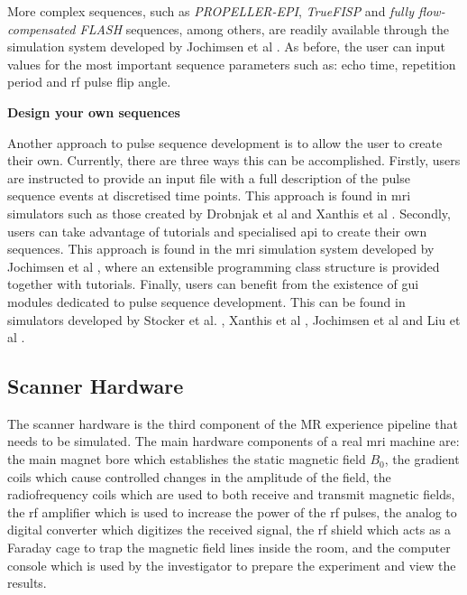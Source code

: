 \hfill

More complex sequences, such as \textit{PROPELLER-EPI}, \textit{TrueFISP} and \textit{fully flow-compensated FLASH} sequences, among others, are readily available through the simulation system developed by Jochimsen et al \cite{Jochimsen2004}.
As before, the user can input values for the most important sequence parameters such as: echo time, repetition period and \ac{rf} pulse flip angle.


\hfill

\large \textbf{Design your own sequences} \normalsize

Another approach to pulse sequence development is to allow the user to create their own.
Currently, there are three ways this can be accomplished.
Firstly, users are instructed to provide an input file with a full description of the pulse sequence events at discretised time points.
This approach is found in \ac{mri} simulators such as those created by Drobnjak et al \cite{Drobnjak2006} and Xanthis et al \cite{Xanthis2014}.
Secondly, users can take advantage of tutorials and specialised \ac{api} to create their own sequences.
This approach is found in the \ac{mri} simulation system developed by Jochimsen et al \cite{Jochimsen2004}, where an extensible programming class structure is provided together with tutorials.
Finally, users can benefit from the existence of \ac{gui} modules dedicated to pulse sequence development.
This can be found in simulators developed by Stocker et al. \cite{Stocker2010}, Xanthis et al \cite{Xanthis2014}, Jochimsen et al \cite{Jochimsen2004} and Liu et al \cite{Liu2013}.

\hfill

\subsection{Scanner Hardware}

The scanner hardware is the third component of the MR experience pipeline that needs to be simulated.
The main hardware components of a real \ac{mri} machine are: 
the main magnet bore which establishes the static magnetic field $B_0$, 
the gradient coils which cause controlled changes in the amplitude of the field,
the radiofrequency coils which are used to both receive and transmit magnetic fields,
the \ac{rf} amplifier which is used to increase the power of the \ac{rf} pulses,
the analog to digital converter which digitizes the received signal,
the \ac{rf} shield which acts as a Faraday cage to trap the magnetic field lines inside the room, and
the computer console which is used by the investigator to prepare the experiment and view the results.


